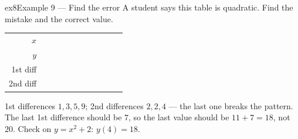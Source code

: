 \documentclass[11pt]{article}
\begin{document}
\begin{example}{ex8}{Example 9 --- Find the error}
A student says this table is quadratic. Find the mistake and the correct value.
\begin{center}\renewcommand{\arraystretch}{1.15}\setlength{\tabcolsep}{2pt}\begin{tabular}{r|>{\centering\arraybackslash}p{0.62cm}>{\centering\arraybackslash}p{0.62cm}>{\centering\arraybackslash}p{0.62cm}>{\centering\arraybackslash}p{0.62cm}>{\centering\arraybackslash}p{0.62cm}>{\centering\arraybackslash}p{0.62cm}>{\centering\arraybackslash}p{0.62cm}>{\centering\arraybackslash}p{0.62cm}>{\centering\arraybackslash}p{0.62cm}>{\centering\arraybackslash}p{0.62cm}}
$x$ & \multicolumn{2}{c}{\colorbox{iagreen}{\makebox[1.12cm]{\strut \color{white}\bfseries $0$}}} & \multicolumn{2}{c}{\colorbox{iagreen}{\makebox[1.12cm]{\strut \color{white}\bfseries $1$}}} & \multicolumn{2}{c}{\colorbox{iagreen}{\makebox[1.12cm]{\strut \color{white}\bfseries $2$}}} & \multicolumn{2}{c}{\colorbox{iagreen}{\makebox[1.12cm]{\strut \color{white}\bfseries $3$}}} & \multicolumn{2}{c}{\colorbox{iagreen}{\makebox[1.12cm]{\strut \color{white}\bfseries $4$}}} \\[2pt]
$y$ & \multicolumn{2}{c}{\colorbox{keybg}{\makebox[1.12cm]{\strut $2$}}} & \multicolumn{2}{c}{\colorbox{keybg}{\makebox[1.12cm]{\strut $3$}}} & \multicolumn{2}{c}{\colorbox{keybg}{\makebox[1.12cm]{\strut $6$}}} & \multicolumn{2}{c}{\colorbox{keybg}{\makebox[1.12cm]{\strut $11$}}} & \multicolumn{2}{c}{\colorbox{keybg}{\makebox[1.12cm]{\strut $20$}}} \\[2pt]
\textcolor{exblue}{\scriptsize 1st diff} & & \multicolumn{2}{c}{\colorbox{exbg}{\makebox[1.12cm]{\strut \textcolor{exblue}{$+1$}}}} & \multicolumn{2}{c}{\colorbox{exbg}{\makebox[1.12cm]{\strut \textcolor{exblue}{$+3$}}}} & \multicolumn{2}{c}{\colorbox{exbg}{\makebox[1.12cm]{\strut \textcolor{exblue}{$+5$}}}} & \multicolumn{2}{c}{\colorbox{exbg}{\makebox[1.12cm]{\strut \textcolor{exblue}{$+9$}}}} & \\[2pt]
\textcolor{qorange}{\scriptsize 2nd diff} & & & \multicolumn{2}{c}{\colorbox{qbg}{\makebox[1.12cm]{\strut \textcolor{qorange!70!black}{$+2$}}}} & \multicolumn{2}{c}{\colorbox{qbg}{\makebox[1.12cm]{\strut \textcolor{qorange!70!black}{$+2$}}}} & \multicolumn{2}{c}{\colorbox{qbg}{\makebox[1.12cm]{\strut \textcolor{qorange!70!black}{$+4$}}}} & & \\
\end{tabular}\end{center}
\soln 1st differences $1,3,5,9$; 2nd differences $2,2,4$ --- the last one breaks the pattern. The last 1st difference should be $7$, so the last value should be $11+7=18$, not $20$. Check on $y=x^2+2$: $y(4)=18$.

\end{example}
\end{document}
